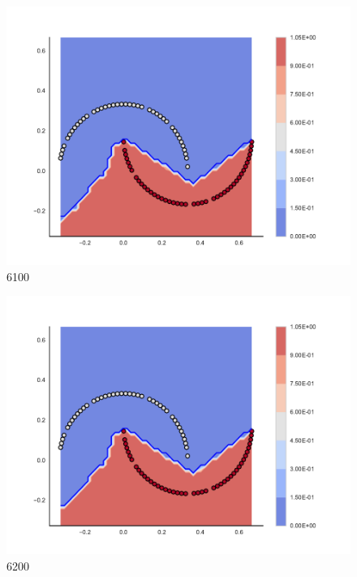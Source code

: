 \begin{subfigure}[b]{0.09\textwidth}
    \includegraphics[clip, trim=2.35cm 1.75cm 4.5cm 0cm,width=\textwidth]{img/convergence/6100.pdf}
    \caption{6100}
    \label{fig:convergence_6100}
\end{subfigure}
%
\begin{subfigure}[b]{0.09\textwidth}
    \includegraphics[clip, trim=2.35cm 1.75cm 4.5cm 0cm,width=\textwidth]{img/convergence/6200.pdf}
    \caption{6200}
    \label{fig:convergence_6200}
\end{subfigure}
%
